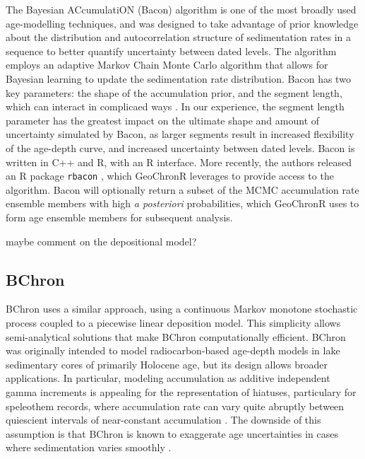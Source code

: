 \documentclass[gchron, manuscript]{copernicus}
\begin{document}
The Bayesian ACcumulatiON (Bacon) algorithm \citep{bacon} is one of the most broadly used age-modelling techniques, and was designed to take advantage of prior knowledge about the distribution and autocorrelation structure of sedimentation rates in a sequence to better quantify uncertainty between dated levels.
The algorithm employs an adaptive Markov Chain Monte Carlo algorithm that allows for Bayesian learning to update the sedimentation rate distribution.
Bacon has two key parameters: the shape of the accumulation prior, and the segment length, which can interact in complicaed ways \citep{trachsel2017}.
In our experience, the segment length parameter has the greatest impact on the ultimate shape and amount of uncertainty simulated by Bacon, as larger segments result in increased flexibility of the age-depth curve, and increased uncertainty between dated levels.
Bacon is written in C++ and R, with an R interface.
More recently, the authors released an R package \texttt{rbacon} \citep{baconPackage}, which GeoChronR leverages to provide access to the algorithm.
Bacon will optionally return a subset of the MCMC accumulation rate ensemble members with high \emph{a posteriori} probabilities, which GeoChronR uses to form age ensemble members for subsequent analysis.

maybe comment on the depositional model?

\subsection{BChron}

BChron \citep{bchronl, parnell2008flexible} uses a similar approach, using a continuous Markov monotone stochastic process coupled to a piecewise linear deposition model.
This simplicity allows semi-analytical solutions that make BChron computationally efficient. BChron was originally intended to model radiocarbon-based age-depth models in lake sedimentary cores of primarily Holocene age, but its design allows broader applications.
In particular, modeling accumulation as additive independent gamma increments is appealing for the representation of hiatuses, particulary for speleothem records, where accumulation rate can vary quite abruptly between quiescient intervals of near-constant accumulation \citep[\citet{Hu_epsl17}]{Parnell_QSR2011, PRYSM}.
The downside of this assumption is that BChron is known to exaggerate age uncertainties in cases where sedimentation varies smoothly \citep{trachsel2017}.
\end{document}
